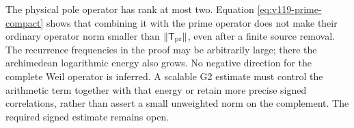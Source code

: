 The physical pole operator has rank at most two.  Equation
\eqref{eq:v119-prime-compact} shows that combining it with the prime
operator does not make their ordinary operator norm smaller than
$\|\mathsf T_{\rm pr}\|$, even after a finite source removal.
The recurrence frequencies in the proof may be arbitrarily large;
there the archimedean logarithmic energy also grows.  No negative
direction for the complete Weil operator is inferred.  A scalable G2
estimate must control the arithmetic term together with that energy
or retain more precise signed correlations, rather than assert a small
unweighted norm on the complement.  The required signed estimate
remains open.
